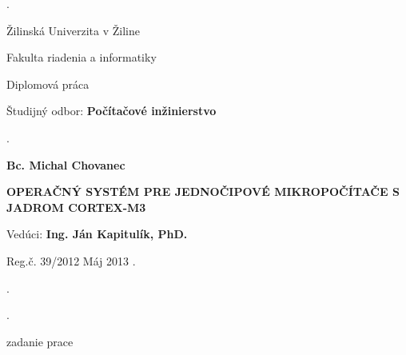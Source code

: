 \begin{titlepage}
\phantom.

\bigskip

\begin{center}
{\sc\LARGE Žilinská Univerzita v Žiline}
\medskip

{\sc\Large Fakulta riadenia a informatiky}

\vfill\vfill\vfill\vfill

{\sc\LARGE Diplomová práca}

\medskip

{\large Študijný odbor: {\bf Počítačové inžinierstvo}}
\end{center}


\vfill\vfill\vfill\vfill


\phantom.\hfill
\begin{minipage}{10cm}
\begin{center}
{\large\bf Bc. Michal Chovanec}

\medskip

{\bf OPERAČNÝ SYSTÉM PRE JEDNOČIPOVÉ MIKROPOČÍTAČE S JADROM CORTEX-M3} 

\medskip

Vedúci: {\bf Ing. Ján Kapitulík, PhD.}

\medskip
 
\hfill
Reg.č. 39/2012
\hfill
Máj 2013
\hfill\phantom.
\end{center}
\end{minipage}
\hspace{1.7cm}\phantom.

\vspace{2.9cm}

\phantom.
\end{titlepage}



\newpage
zadanie prace


